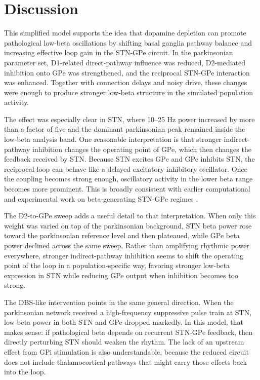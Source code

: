 \documentclass[11pt]{article}
\begin{document}
\section{Discussion}
This simplified model supports the idea that dopamine depletion can promote pathological low-beta oscillations by shifting basal ganglia pathway balance and increasing effective loop gain in the STN-GPe circuit. In the parkinsonian parameter set, D1-related direct-pathway influence was reduced, D2-mediated inhibition onto GPe was strengthened, and the reciprocal STN-GPe interaction was enhanced. Together with connection delays and noisy drive, these changes were enough to produce stronger low-beta structure in the simulated population activity.

The effect was especially clear in STN, where 10--25 Hz power increased by more than a factor of five and the dominant parkinsonian peak remained inside the low-beta analysis band. One reasonable interpretation is that stronger indirect-pathway inhibition changes the operating point of GPe, which then changes the feedback received by STN. Because STN excites GPe and GPe inhibits STN, the reciprocal loop can behave like a delayed excitatory-inhibitory oscillator. Once the coupling becomes strong enough, oscillatory activity in the lower beta range becomes more prominent. This is broadly consistent with earlier computational and experimental work on beta-generating STN-GPe regimes \citep{Kumar2011,Mallet2008,Holgado2010}.

The D2-to-GPe sweep adds a useful detail to that interpretation. When only this weight was varied on top of the parkinsonian background, STN beta power rose toward the parkinsonian reference level and then plateaued, while GPe beta power declined across the same sweep. Rather than amplifying rhythmic power everywhere, stronger indirect-pathway inhibition seems to shift the operating point of the loop in a population-specific way, favoring stronger low-beta expression in STN while reducing GPe output when inhibition becomes too strong.

The DBS-like intervention points in the same general direction. When the parkinsonian network received a high-frequency suppressive pulse train at STN, low-beta power in both STN and GPe dropped markedly. In this model, that makes sense: if pathological beta depends on recurrent STN-GPe feedback, then directly perturbing STN should weaken the rhythm. The lack of an upstream effect from GPi stimulation is also understandable, because the reduced circuit does not include thalamocortical pathways that might carry those effects back into the loop.
\end{document}
